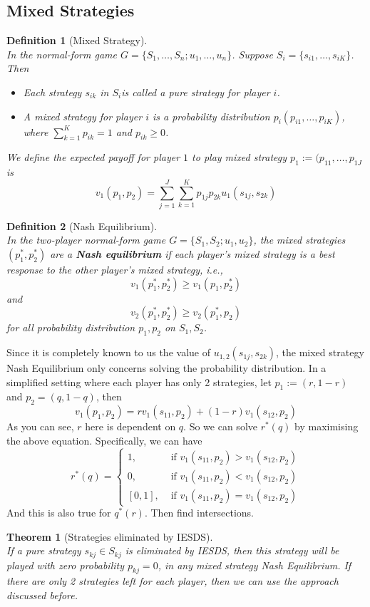 \documentclass[12pt]{article}
\newtheorem{definition}{Definition}[section]
\newtheorem{theorem}{Theorem}[section]
\theoremstyle{definition}
\begin{document}
\subsection{Mixed Strategies}
\begin{definition}[Mixed Strategy]
\hfill\\\normalfont In the normal-form game $G=\{S_1,\ldots, S_n; u_1,\ldots, u_n\}$. Suppose $S_i=\{s_{i1}, \ldots, s_{iK}\}$. Then
\begin{itemize}
  \item Each strategy $s_{ik}$ in $S_i$is called a pure strategy for player $i$.
  \item A mixed strategy for player $i$ is a probability distribution $p_i(p_{i1}, \ldots, p_{iK})$, where $\sum_{k=1}^K p_{ik}=1$ and $p_{ik}\geq 0$.
\end{itemize}
We define the expected payoff for player $1$ to play mixed strategy $p_1:=(p_{11}, \ldots, p_{1J}$ is
\[
v_1(p_1,p_2)=\sum_{j=1}^J \sum_{k=1}^K p_{1j}p_{2k}u_1(s_{1j}, s_{2k})
\]
\end{definition}
\begin{definition}[Nash Equilibrium]
\hfill\\\normalfont In the two-player normal-form game $G=\{S_1,S_2; u_1,u_2\}$, the mixed strategies $(p_1^\ast, p_2^\ast)$ are a \textbf{Nash equilibrium} if each player's mixed strategy is a best response to the other player's mixed strategy, i.e.,
\[
v_1(p_1^\ast, p_2^\ast)\geq v_1(p_1, p_2^\ast)
\]
and 
\[
v_2(p_1^\ast, p_2^\ast)\geq v_2(p_1^\ast, p_2)
\]
for all probability distribution $p_1, p_2$ on $S_1, S_2$.
\end{definition}
Since it is completely known to us the value of $u_{1,2}(s_{1j}, s_{2k})$, the mixed strategy Nash Equilibrium only concerns solving the probability distribution. In a simplified setting where each player has only 2 strategies, let $p_1:=(r, 1-r)$ and $p_2=(q, 1-q)$, then 
\[
v_1(p_1, p_2)=rv_1(s_{11}, p_2)+(1-r)v_1(s_{12}, p_2)
\]
As you can see, $r$ here is dependent on $q$. So we can solve $r^\ast(q)$ by maximising the above equation. Specifically, we can have
\[
r^\ast(q)=\begin{cases}
1, &\text{ if }v_1(s_{11}, p_2)>v_1(s_{12}, p_2)\\
0, &\text{ if }v_1(s_{11}, p_2)<v_1(s_{12}, p_2)\\
[0,1], &\text{ if }v_1(s_{11}, p_2)=v_1(s_{12}, p_2)
\end{cases}
\]
And this is also true for $q^\ast(r)$. Then find intersections.
\begin{theorem}[Strategies eliminated by IESDS]
\hfill\\\normalfont If a pure strategy $s_{kj}\in S_{kj}$ is eliminated by IESDS, then this strategy will be played with zero probability $p_{kj}=0$, in any mixed strategy Nash Equilibrium. If there are only 2 strategies left for each player, then we can use the approach discussed before.
\end{theorem}
\end{document}
